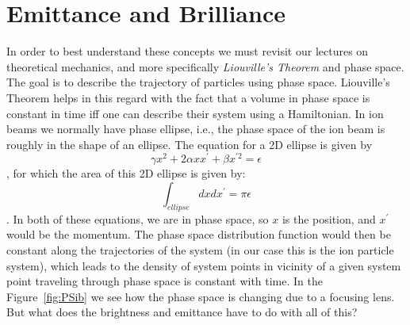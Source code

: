\section{Emittance and Brilliance}
In order to best understand these concepts we must revisit our lectures on theoretical mechanics, and more specifically \textit{Liouville's Theorem} and phase space.
The goal is to describe the trajectory of particles using phase space.
Liouville's Theorem helps in this regard with the fact that a volume in phase space is constant in time iff one can describe their system using a Hamiltonian.
In ion beams we normally have phase ellipse, i.e., the phase space of the ion beam is roughly in the shape of an ellipse.
The equation for a 2D ellipse is given by\[ \gamma x^2 + 2\alpha x x^{\prime} + \beta x^{\prime 2} = \epsilon \], for which the area of this 2D ellipse is given by: \[ \int_{ellipse} dxdx^\prime = \pi \epsilon \].
In both of these equations, we are in phase space, so $x$ is the position, and $x^\prime$ would be the momentum.
The phase space distribution function would then be constant along the trajectories of the system (in our case this is the ion particle system), which leads to the density of system points in vicinity of a given system point traveling through phase space is constant with time.
In the Figure~\ref{fig:PSib} we see how the phase space is changing due to a focusing lens.
But what does the brightness and emittance have to do with all of this?

